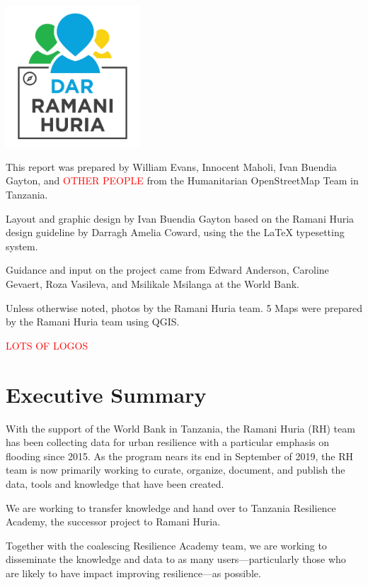 \documentclass[a4paper,12pt,twoside]{article}
\begin{document}
\newpage
\color{RHgrey}

\begin{center}
{\includegraphics[width=5cm]{Dar_Ramani_Huria_logo.png}}
\end{center}

This report was prepared by William Evans, Innocent Maholi, Ivan Buendia Gayton, and \textcolor{red}{OTHER PEOPLE} from the Humanitarian OpenStreetMap Team in Tanzania.

\medskip

Layout and graphic design by Ivan Buendia Gayton based on the Ramani Huria design guideline by Darragh Amelia Coward, using the the \LaTeX { } typesetting system.

\medskip

Guidance and input on the project came from Edward Anderson, Caroline Gevaert, Roza Vasileva, and Msilikale Msilanga at the World Bank.

\medskip

Unless otherwise noted, photos by the Ramani Huria team.
5
 Maps were prepared by the Ramani Huria team using QGIS.

\bigskip\bigskip

\textcolor{red}{LOTS OF LOGOS}

\newpage

\tableofcontents

\newpage
\section{Executive Summary}
\label{executivesummary}
\begin{multicols}{2}
With the support of the World Bank in Tanzania, the Ramani Huria (RH) team has been collecting data for urban resilience with a particular emphasis on flooding since 2015. As the program nears its end in September of 2019, the RH team is now primarily working to curate, organize, document, and publish the data, tools and knowledge that have been created. 

We are working to transfer knowledge and hand over to Tanzania Resilience Academy, the successor project to Ramani Huria. 

Together with the coalescing Resilience Academy team, we are working to disseminate the knowledge and data to as many users---particularly those who are likely to have impact improving resilience---as possible. 

\end{multicols}
\end{document}
